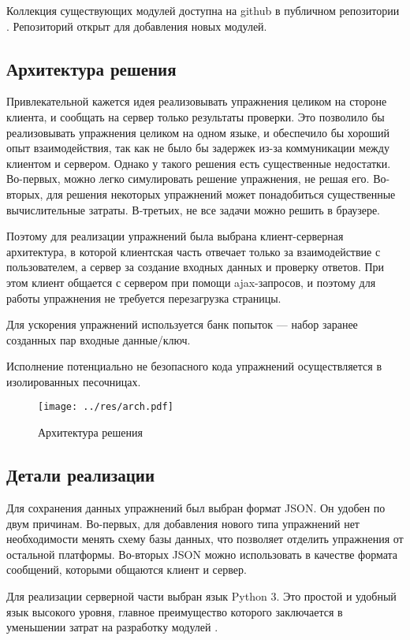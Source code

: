 \documentclass{matmex-diploma-custom}
\begin{document}
Коллекция существующих модулей доступна на github в публичном
репозитории \cite{plugins:repo}. Репозиторий открыт для добавления
новых модулей.

\subsection{Архитектура решения}
Привлекательной кажется идея реализовывать упражнения целиком на
стороне клиента, и сообщать на сервер только результаты проверки. Это
позволило бы реализовывать упражнения целиком на одном языке, и
обеспечило бы хороший опыт взаимодействия, так как не было бы задержек
из-за коммуникации между клиентом и сервером. Однако у такого решения
есть существенные недостатки. Во-первых, можно легко симулировать
решение упражнения, не решая его. Во-вторых, для решения некоторых
упражнений может понадобиться существенные вычислительные
затраты. В-третьих, не все задачи можно решить в браузере.

Поэтому для реализации упражнений была выбрана клиент-серверная
архитектура, в которой клиентская часть отвечает только за
взаимодействие с пользователем, а сервер за создание входных данных и
проверку ответов. При этом клиент общается с сервером при помощи
ajax-запросов, и поэтому для работы упражнения не требуется
перезагрузка страницы.

Для ускорения упражнений используется банк попыток --- набор
заранее созданных пар входные данные/ключ.

Исполнение потенциально не безопасного кода упражнений осуществляется
в изолированных песочницах.

\begin{figure}[h]
  \texttt{[image: ../res/arch.pdf]}
  \caption{Архитектура решения}
\end{figure}

\subsection{Детали реализации}
Для сохранения данных упражнений был выбран формат JSON. Он удобен по
двум причинам. Во-первых, для добавления нового типа упражнений нет
необходимости менять схему базы данных, что позволяет отделить
упражнения от остальной платформы. Во-вторых JSON можно использовать в
качестве формата сообщений, которыми общаются клиент и сервер.

Для реализации серверной части выбран язык Python 3. Это простой и
удобный язык высокого уровня, главное преимущество которого
заключается в уменьшении затрат на разработку модулей  \cite{pyprod}.
\end{document}
